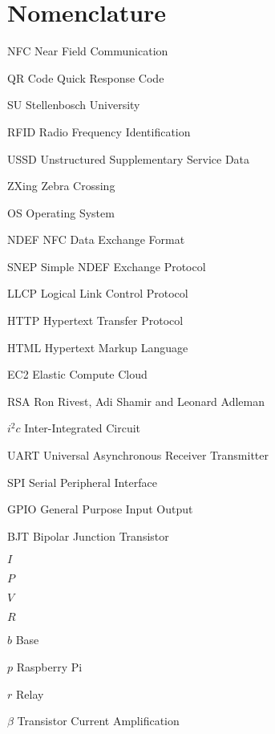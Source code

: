 \chapter{Nomenclature}

\begin{Nomencl}
   \item[NFC]\dotfill Near Field Communication
   \item[QR Code]\dotfill Quick Response Code
   \item[SU]\dotfill Stellenbosch University
   \item[RFID]\dotfill Radio Frequency Identification
   \item[USSD]\dotfill Unstructured Supplementary Service Data
   \item[ZXing]\dotfill Zebra Crossing
   \item[OS]\dotfill Operating System
   \item[NDEF]\dotfill NFC Data Exchange Format
   \item[SNEP]\dotfill Simple NDEF Exchange Protocol
   \item[LLCP]\dotfill Logical Link Control Protocol
   \item[HTTP]\dotfill Hypertext Transfer Protocol
   \item[HTML]\dotfill Hypertext Markup Language
   \item[EC2]\dotfill Elastic Compute Cloud
   \item[RSA]\dotfill Ron Rivest, Adi Shamir and Leonard Adleman
   \item[$i^2c$]\dotfill Inter-Integrated Circuit
   \item[UART]\dotfill Universal Asynchronous Receiver Transmitter
   \item[SPI]\dotfill Serial Peripheral Interface
   \item[GPIO]\dotfill General Purpose Input Output
   \item[BJT]\dotfill Bipolar Junction Transistor
   \item[$I$]
   \item[$P$]
   \item[$V$]
   \item[$R$]
   \item[$b$]\dotfill Base
   \item[$p$]\dotfill Raspberry Pi
   \item[$r$]\dotfill Relay
   \item[$\beta$]\dotfill Transistor Current Amplification  
\end{Nomencl}


\endinput
